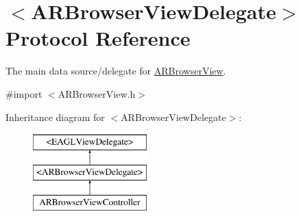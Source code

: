 \hypertarget{protocol_a_r_browser_view_delegate-p}{\section{$<$A\-R\-Browser\-View\-Delegate$>$ Protocol Reference}
\label{protocol_a_r_browser_view_delegate-p}
}


The main data source/delegate for \hyperlink{interface_a_r_browser_view}{A\-R\-Browser\-View}.  




{\ttfamily \#import $<$A\-R\-Browser\-View.\-h$>$}

Inheritance diagram for $<$A\-R\-Browser\-View\-Delegate$>$\-:\begin{figure}[H]
\begin{center}
\leavevmode
\includegraphics[height=3.000000cm]{protocol_a_r_browser_view_delegate-p}
\end{center}
\end{figure}
